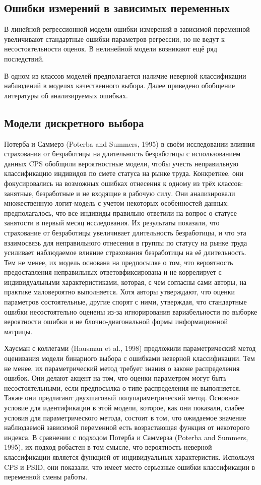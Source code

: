 \subsection{Ошибки измерений в зависимых переменных} 
В линейной регрессионной модели ошибки измерений в зависимой переменной увеличивают стандартные ошибки параметров регрессии, но не ведут к несостоятельности оценок. В нелинейной модели возникают ещё ряд последствий.

В одном из классов моделей предполагается наличие неверной классификации наблюдений в моделях качественного выбора. Далее приведено обобщение литературы об анализируемых ошибках.

\subsection*{Модели дискретного выбора} 
Потерба и Саммерз (Poterba and Summers, 1995) в своём исследовании влияния страхования от безработицы на длительность безработицы с использованием данных CPS обобщили вероятностные модели, чтобы учесть неправильную классификацию индивидов по смете статуса на рынке труда. Конкретнее, они фокусировались на возможных ошибках отнесения к одному из трёх классов: занятные, безработные и не входящие в рабочую силу. Они анализировали множественную логит-модель с учетом некоторых особенностей данных: предполагалось, что все индивиды правильно ответили на вопрос о статусе занятости в первый месяц исследования. Их результаты показали, что страхование от безработицы увеличивает длительность безработицы, и что эта взаимосвязь для неправильного отнесения в группы по статусу на рынке труда усиливает наблюдаемое влияние страхования безработицы на её длительность. Тем не менее, их модель основана на предпосылке о том, что вероятность предоставления неправильных ответовфиксирована и не коррелирует с индивидуальными характеристиками, которая, с чем согласны сами авторы, на практике маловероятно выполняется. Хотя авторы утверждают, что оценки параметров состоятельные, другие спорят с ними, утверждая, что стандартные ошибки несостоятельно оценены из-за игнорирования вариабельности по выборке вероятности ошибки и не блочно-диагональной формы информационной матрицы.

Хаусман с коллегами (Hausman et al., 1998) предложили параметрический метод оценивания модели бинарного выбора с ошибками неверной классификации. Тем не менее, их параметрический метод требует знания о законе распределения ошибок. Они делают  акцент на том, что оценки параметром могут быть несостоятельными, если предпосылка о типе распределения не выполняется. Также они предлагают двухшаговый полупараметрический метод. Основное условие для идентификации в этой модели, которое, как они показали, слабее условия для параметрического метода, состоит в том, что ожидаемое значение наблюдаемой зависимой переменной есть возрастающая функция от некоторого индекса. В сравнении с подходом Потерба и Саммерза (Poterba and Summers, 1995), их подход робастен в том смысле, что вероятность неверной классификации является функцией от индивидуальных характеристик. Используя CPS и PSID, они показали, что имеет место серьезные ошибки классификации в переменной смены работы.

